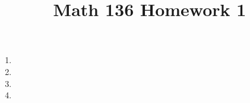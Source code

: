 \documentclass{article}
\title{Math 136 Homework 1}
\begin{document}
    \maketitle
    \begin{enumerate}
      \item 
      \item 
      \item 
      \item 
    \end{enumerate}
\end{document}
